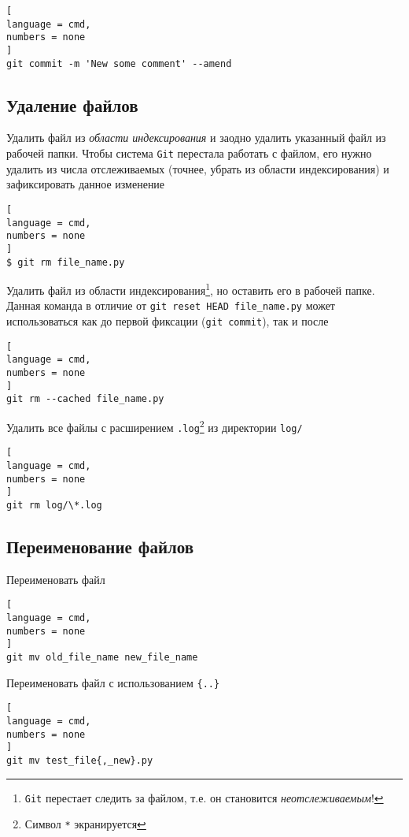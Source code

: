 \documentclass[%
	11pt,
	a4paper,
	utf8,
		]{article}
\begin{document}
\begin{lstlisting}[
language = cmd,
numbers = none
]
git commit -m 'New some comment' --amend
\end{lstlisting}


\subsection{Удаление файлов}

Удалить файл из \emph{области индексирования} и заодно удалить указанный файл из рабочей папки. Чтобы система \texttt{Git} перестала работать с файлом, его нужно удалить из числа отслеживаемых (точнее, убрать из области индексирования) и зафиксировать данное изменение 

\begin{lstlisting}[
language = cmd,
numbers = none
]
$ git rm file_name.py
\end{lstlisting}


Удалить файл из области индексирования\footnote{\texttt{Git} перестает следить за файлом, т.е. он становится \emph{неотслеживаемым}!}, но оставить его в рабочей папке. Данная команда в отличие от \texttt{git reset HEAD file\_name.py} может использоваться как до первой фиксации (\texttt{git commit}), так и после

\begin{lstlisting}[
language = cmd,
numbers = none
]
git rm --cached file_name.py
\end{lstlisting}


Удалить все файлы с расширением \texttt{.log}\footnote{Символ \texttt{*} экранируется} из директории \texttt{log/}

\begin{lstlisting}[
language = cmd,
numbers = none
]
git rm log/\*.log
\end{lstlisting}


\subsection{Переименование файлов}

Переименовать файл

\begin{lstlisting}[
language = cmd,
numbers = none
]
git mv old_file_name new_file_name
\end{lstlisting}


Переименовать файл с использованием \texttt{\{..\}}
\begin{lstlisting}[
language = cmd,
numbers = none
]
git mv test_file{,_new}.py
\end{lstlisting}
\end{document}
